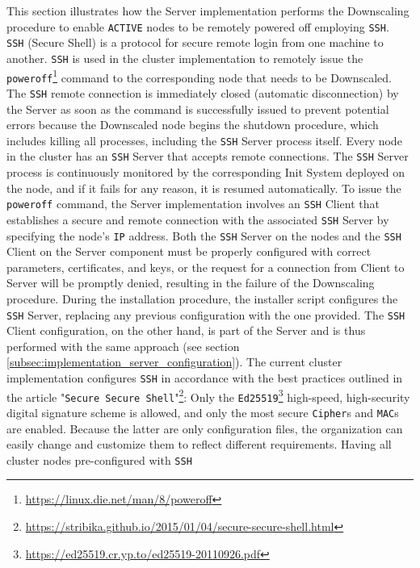 This section illustrates how the Server implementation performs the Downscaling procedure
to enable \texttt{ACTIVE} nodes to be remotely powered off employing \texttt{SSH}.
\\ %
\texttt{SSH} (Secure Shell) is a protocol for secure remote login from one
machine to another. \texttt{SSH} is used in the cluster implementation to
remotely issue the \texttt{poweroff}\footnote{\url{https://linux.die.net/man/8/poweroff}}
command to the corresponding node that needs to be Downscaled. The \texttt{SSH} remote
connection is immediately closed (automatic disconnection) by the Server as soon
as the command is successfully issued to prevent potential errors because the Downscaled
node begins the shutdown procedure, which includes killing all processes, including
the \texttt{SSH} Server process itself. Every node in the cluster has an \texttt{SSH}
Server that accepts remote connections. The \texttt{SSH} Server process is
continuously monitored by the corresponding Init System deployed on the node, and
if it fails for any reason, it is resumed automatically. To issue the \texttt{poweroff}
command, the Server implementation involves an \texttt{SSH} Client that
establishes a secure and remote connection with the associated \texttt{SSH} Server
by specifying the node's \texttt{IP} address. Both the \texttt{SSH} Server on
the nodes and the \texttt{SSH} Client on the Server component must be properly configured
with correct parameters, certificates, and keys, or the request for a connection
from Client to Server will be promptly denied, resulting in the failure of the Downscaling
procedure. During the installation procedure, the installer script configures the
\texttt{SSH} Server, replacing any previous configuration with the one provided.
The \texttt{SSH} Client configuration, on the other hand, is part of the Server and
is thus performed with the same approach (see section
\ref{subsec:implementation_server_configuration}). The current cluster
implementation configures \texttt{SSH} in accordance with the best practices outlined
in the article "\texttt{Secure Secure Shell}"\footnote{\url{https://stribika.github.io/2015/01/04/secure-secure-shell.html}}:
Only the \texttt{Ed25519}\footnote{\url{https://ed25519.cr.yp.to/ed25519-20110926.pdf}}
high-speed, high-security digital signature scheme is allowed, and only the most
secure \texttt{Cipher}s and \texttt{MAC}s are enabled. Because the latter are only
configuration files, the organization can easily change and customize them to
reflect different requirements. Having all cluster nodes pre-configured with \texttt{SSH}
